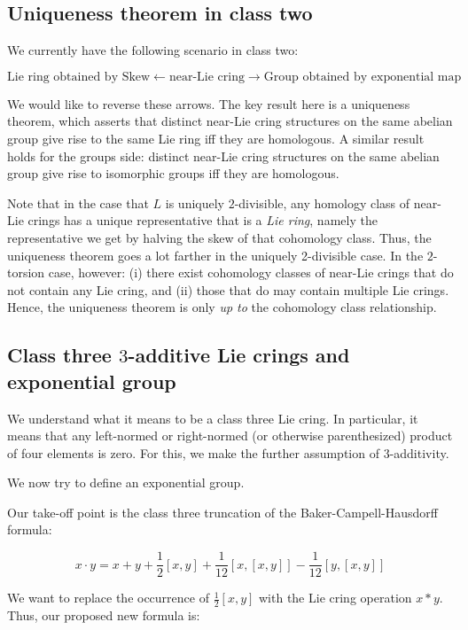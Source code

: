 \documentclass[10pt]{amsart}
\begin{document}
\subsection{Uniqueness theorem in class two}

We currently have the following scenario in class two:

$$\text{Lie ring obtained by Skew} \leftarrow \text{near-Lie cring}
\rightarrow \text{Group obtained by exponential map}$$

We would like to reverse these arrows. The key result here is a
uniqueness theorem, which asserts that distinct near-Lie cring
structures on the same abelian group give rise to the same Lie ring
iff they are homologous. A similar result holds for the groups side:
distinct near-Lie cring structures on the same abelian group give
rise to isomorphic groups iff they are homologous.

Note that in the case that $L$ is uniquely $2$-divisible, any homology
class of near-Lie crings has a unique representative that is a {\em
Lie ring}, namely the representative we get by halving the skew of
that cohomology class. Thus, the uniqueness theorem goes a lot farther
in the uniquely 2-divisible case. In the $2$-torsion case, however:
(i) there exist cohomology classes of near-Lie crings that do not
contain any Lie cring, and (ii) those that do may contain multiple Lie
crings. Hence, the uniqueness theorem is only {\em up to} the
cohomology class relationship.

\subsection{Class three $3$-additive Lie crings and exponential group}

We understand what it means to be a class three Lie cring. In
particular, it means that any left-normed or right-normed (or
otherwise parenthesized) product of four elements is zero. For this,
we make the further assumption of $3$-additivity.

We now try to define an exponential group.

Our take-off point is the class three truncation of the
Baker-Campell-Hausdorff formula:

$$x \cdot y = x + y + \frac{1}{2}[x,y] + \frac{1}{12}[x,[x,y]] - \frac{1}{12}[y,[x,y]]$$

We want to replace the occurrence of $\frac{1}{2}[x,y]$ with the Lie
cring operation $x * y$. Thus, our proposed new formula is:
\end{document}
